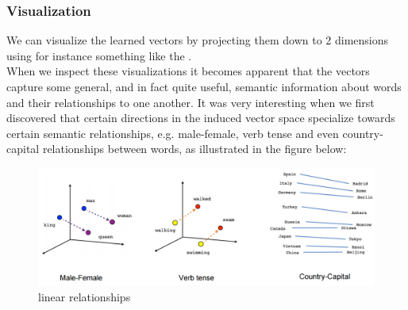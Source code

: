 \subsubsection{Visualization}
\label{visual}
 We can visualize the learned vectors by projecting them down to 2 dimensions using for instance something like the \textcite{t-SNE dimensionality reduction technique}.\\ When we inspect these visualizations it becomes apparent that the vectors capture some general, and in fact quite useful, semantic information about words and their relationships to one another. It was very interesting when we first discovered that certain directions in the induced vector space specialize towards certain semantic relationships, e.g. male-female, verb tense and even country-capital relationships between words, as illustrated in the figure below:
 
  \begin{figure}[H]%
      \center%
        \includegraphics[width=1\textwidth]{images/amira/linear-relationships.png}%
        \caption[Analogies between words]{linear relationships}\label{fig:nce-nplm}%
  \end{figure}


